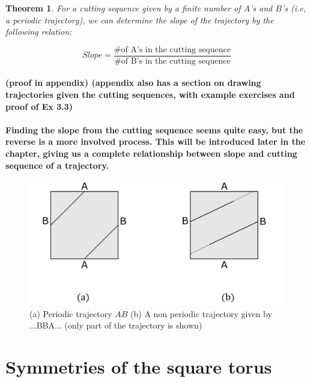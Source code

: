 \documentclass{report}
\newtheorem{theorem}{Theorem}[chapter]
\begin{document}
\begin{theorem}
{For a cutting sequence given by a finite number of $A$’s and $B$’s (i.e, a periodic trajectory), we can determine the slope of the trajectory by the following relation:}

\begin{equation}
{Slope = \frac{\text{\# of A's in the cutting sequence}}{\text{\# of B's in the cutting sequence}} }
\end{equation}
\end{theorem}


\paragraph{(proof in appendix) 
(appendix also has a section on drawing trajectories given the cutting sequences, with example exercises and proof of Ex 3.3)}


\paragraph{Finding the slope from the cutting sequence seems quite easy, but the reverse is a more involved process. This will be introduced later in the chapter, giving us a complete relationship between slope and cutting sequence of a trajectory.}


\begin{figure} 
\begin{center}
\includegraphics[scale=0.3]{2.4}
\caption{(a) Periodic trajectory $\overline{AB}$ (b) A non periodic trajectory given by ...BBA... (only part of the trajectory is shown)}
\end{center}
\end{figure}

\pagebreak

\section{Symmetries of the square torus}
\end{document}
